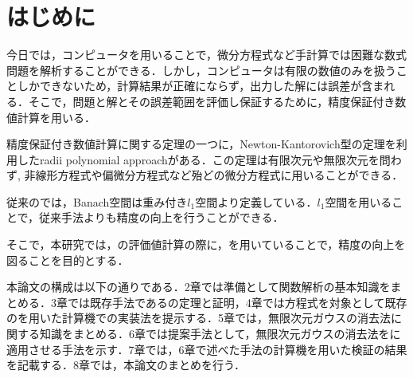 \chapter{はじめに}

今日では，コンピュータを用いることで，微分方程式など手計算では困難な数式問題を解析することができる．しかし，コンピュータは有限の数値のみを扱うことしかできないため，計算結果が正確にならず，出力した解には誤差が含まれる．そこで，問題と解とその誤差範囲を評価し保証するために，精度保証付き数値計算を用いる\cite{b1}．

精度保証付き数値計算に関する定理の一つに，Newton-Kantorovich型の定理を利用したradii polynomial approachがある．この定理は有限次元や無限次元を問わず, 非線形方程式や偏微分方程式など殆どの微分方程式に用いることができる．

従来の\rad{}では，Banach空間は重み付き$l_1$空間より定義している．$l_1$空間を用いることで，従来手法よりも精度の向上を行うことができる．

そこで，本研究では，\rad{}の評価値計算の際に，\infg{}を用いていることで，精度の向上を図ることを目的とする．


本論文の構成は以下の通りである．2章では準備として関数解析の基本知識をまとめる．3章では既存手法である\rad{}の定理と証明，4章では\vdp{}方程式を対象として既存の\rad{}を用いた計算機での実装法を提示する．5章では，無限次元ガウスの消去法に関する知識をまとめる．6章では提案手法として，無限次元ガウスの消去法を\rad{}に適用させる手法を示す．7章では，6章で述べた手法の計算機を用いた検証の結果を記載する．8章では，本論文のまとめを行う．
